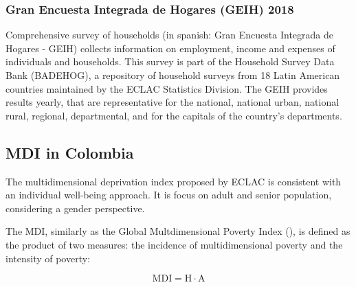 \documentclass[a4paper, 11pt]{article}
\begin{document}
\subsubsection{Gran Encuesta Integrada de Hogares (GEIH) 2018}

Comprehensive survey of households (in spanish: Gran Encuesta Integrada de Hogares - GEIH) collects information on employment, income and expenses of individuals and households. This survey is part of the Household Survey Data Bank (BADEHOG), a repository of household surveys from 18 Latin American countries maintained by the ECLAC Statistics Division.  The GEIH provides results yearly, that are representative for the national, national urban, national rural, regional, departmental, and for the capitals of the country's departments.  
    

    

\subsection{MDI in Colombia}

The multidimensional deprivation index proposed by ECLAC is consistent with an individual well-being approach. It is focus on adult and senior population, considering a gender perspective.


The MDI, similarly as the Global Multdimensional Poverty Index (\cite{Alkire}), is defined as  the product of two measures: the incidence of multidimensional poverty and the intensity of poverty:

\begin{equation*}
    \text{MDI} = \text{H} \cdot \text{A}
\end{equation*}
\end{document}
